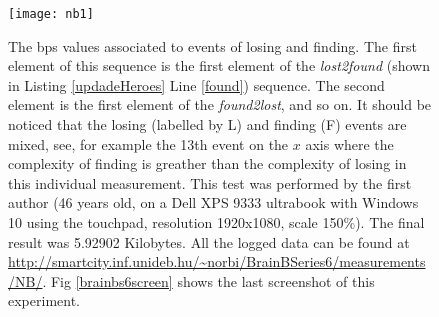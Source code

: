 \begin{figure}
  \centering
     \texttt{[image: nb1]}
  \caption{The bps values associated to events of losing and finding. The first element of this sequence is the first element of the \textit{lost2found} (shown in Listing \ref{updadeHeroes} Line \ref{found}) sequence. 
  The second element is the first element of the \textit{found2lost}, and so on. It should be noticed that the 
  losing (labelled by L) and finding (F) events are mixed, see, for example the 13th event on the $x$ axis where the complexity of finding is greather than the complexity of losing in this individual measurement. This test was performed by the first author (46 years old, 
  on a Dell XPS 9333 ultrabook with Windows 10 using the touchpad, 
  resolution 1920x1080, scale 150\%). The final result was 5.92902 Kilobytes. All the logged data can be found at \url{http://smartcity.inf.unideb.hu/~norbi/BrainBSeries6/measurements/NB/}. Fig \ref{brainbs6screen} shows the last screenshot of this experiment.}
   \label{brainbs6winnb1}
\end{figure}
